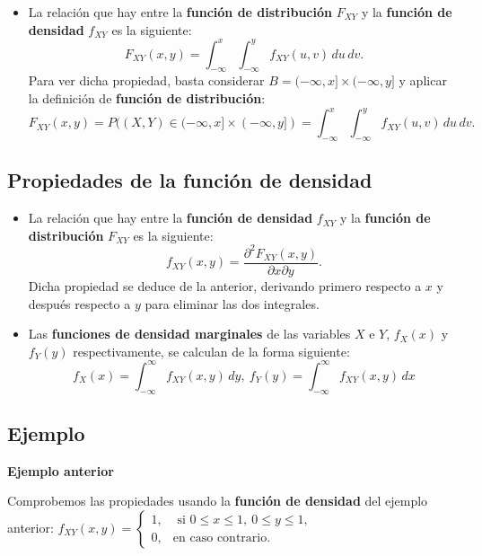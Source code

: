 \documentclass[]{book}
\providecommand{\tightlist}{%
  \setlength{\itemsep}{0pt}\setlength{\parskip}{0pt}}
\begin{document}
\begin{itemize}
\tightlist
\item
  La relación que hay entre la \textbf{función de distribución} \(F_{XY}\) y la \textbf{función de densidad} \(f_{XY}\) es la siguiente:
  \[
  F_{XY}(x,y)=\int_{-\infty}^x\int_{-\infty}^y f_{XY}(u,v)\,du\,dv.
  \]
  Para ver dicha propiedad, basta considerar \(B=(-\infty,x]\times (-\infty,y]\) y aplicar la definición de \textbf{función de distribución}:
  \[
  F_{XY}(x,y)=P((X,Y)\in (-\infty,x]\times (-\infty,y])=\int_{-\infty}^x\int_{-\infty}^y f_{XY}(u,v)\,du\,dv.
  \]
\end{itemize}

\hypertarget{propiedades-de-la-funciuxf3n-de-densidad-2}{%
\subsection{Propiedades de la función de densidad}\label{propiedades-de-la-funciuxf3n-de-densidad-2}}

\begin{itemize}
\item
  La relación que hay entre la \textbf{función de densidad} \(f_{XY}\) y la \textbf{función de distribución} \(F_{XY}\) es la siguiente:
  \[
  f_{XY}(x,y)=\frac{\partial^2 F_{XY}(x,y)}{\partial x\partial y}.
  \]
  Dicha propiedad se deduce de la anterior, derivando primero respecto a \(x\) y después respecto a \(y\) para eliminar las dos integrales.
\item
  Las \textbf{funciones de densidad marginales} de las variables \(X\) e \(Y\), \(f_X(x)\) y \(f_Y(y)\) respectivamente, se calculan de la forma siguiente:
  \[
  f_X(x)=\int_{-\infty}^\infty f_{XY}(x,y)\, dy,\ f_Y(y)=\int_{-\infty}^\infty f_{XY}(x,y)\, dx
  \]
\end{itemize}

\hypertarget{ejemplo-42}{%
\subsection{Ejemplo}\label{ejemplo-42}}

\textbf{Ejemplo anterior}

Comprobemos las propiedades usando la \textbf{función de densidad} del ejemplo anterior:
\(f_{XY}(x,y)=\begin{cases} 1, & \mbox{ si }0\leq x\leq 1,\ 0\leq y\leq 1, \\ 0, & \mbox{en caso contrario.} \end{cases}\)
\end{document}
